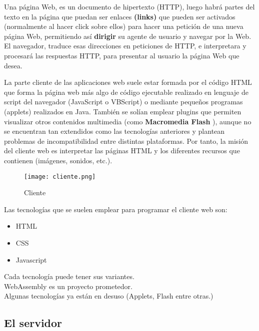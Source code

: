Una página Web, es un documento de hipertexto (HTTP), luego habrá partes del texto en la página que puedan ser enlaces \textbf{(links)} que pueden ser activados (normalmente al hacer click sobre ellos) para hacer una petición de una nueva página Web, permitiendo así \textbf{dirigir} su agente de usuario y navegar por la Web. El navegador, traduce esas direcciones en peticiones de HTTP, e interpretara y procesará las respuestas HTTP, para presentar al usuario la página Web que desea.

La parte cliente de las aplicaciones web suele estar formada por el código HTML
que forma la página web más algo de código ejecutable realizado en lenguaje de script
del navegador (JavaScript o VBScript) o mediante pequeños programas (applets) realizados en Java. También se solían emplear plugins que permiten visualizar otros
contenidos multimedia (como \textbf{Macromedia Flash}
), aunque no se encuentran tan extendidos como las tecnologías anteriores y plantean problemas de incompatibilidad
entre distintas plataformas. Por tanto, la misión del cliente web es interpretar las
páginas HTML y los diferentes recursos que contienen (imágenes, sonidos, etc.).

\newpage

\begin{wrapfigure}{r}{0.5\textwidth}
	\begin{center}
		\texttt{[image: cliente.png]}
	\end{center}
	\caption{Cliente}
\end{wrapfigure}

Las tecnologías que se suelen emplear para programar el cliente web son:

\begin{itemize}
	\item HTML
	\item CSS
	\item Javascript
\end{itemize}

\begin{remark}
	Cada tecnología puede tener sus variantes.\\
	WebAssembly es un proyecto prometedor.\\
	Algunas tecnologías ya están en desuso (Applets, Flash entre otras.)
\end{remark}

\subsection{El servidor}

